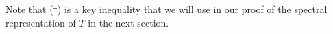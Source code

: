 \begin{remark}
   Note that (\( \dagger \)) is a key inequality that we will use in our proof of the spectral representation of \( T  \) in the next section.
\end{remark}

